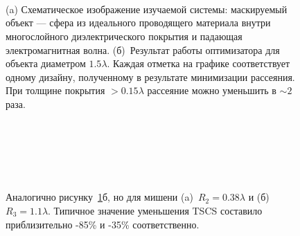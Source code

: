 \begin{figure}[p]
  \begin{minipage}[ht]{0.99\linewidth}
  \end{minipage}\\
  \vfill
  \begin{minipage}[ht]{0.99\linewidth}
  \end{minipage}\\
  \vfill
  \begin{minipage}[ht]{0.99\linewidth}
  \end{minipage}\\
  \vfill
  \begin{minipage}[ht]{0.99\linewidth}
  \end{minipage}
  \vfill

  \caption{(a) Схематическое изображение изучаемой системы:
    маскируемый объект --- сфера из идеального проводящего материала
    внутри многослойного диэлектрического покрытия и падающая
    электромагнитная волна. (б)~Результат работы оптимизатора для
    объекта диаметром $1.5\lambda$.  Каждая отметка на графике
    соответствует одному дизайну, полученному в результате
    минимизации рассеяния. При толщине покрытия $>0.15\lambda$
    рассеяние можно уменьшить в $\sim 2$ раза.}
  \label{img:scattering}  
\end{figure}

\begin{figure}[p]
  \begin{minipage}[ht]{0.99\linewidth}
  \end{minipage}\\
  \begin{minipage}[ht]{0.99\linewidth}
  \end{minipage}\\
  \vfill
  \begin{minipage}[ht]{0.99\linewidth}
  \end{minipage}\\
  \begin{minipage}[ht]{0.99\linewidth}
  \end{minipage}
  \vfill
  \caption{Аналогично рисунку~\ref{img:scattering}б, но для мишени
    (a)~${R_2 = 0.38\lambda}$ и (б)~${R_3 = 1.1\lambda}$.  Типичное
    значение уменьшения TSCS составило приблизительно -85\% и -35\%
    соответственно.  \label{img:rcs-overview-r14-42}}%
\end{figure}


